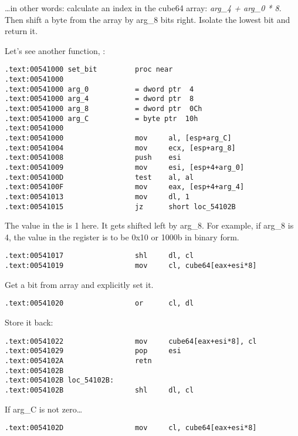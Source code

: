 \dots in other words: calculate an index in 
the cube64 array: \emph{arg\_4 + arg\_0 * 8}.
Then shift a byte from the array by arg\_8 bits right. 
Isolate the lowest bit and return it.

Let's see another function, :

\begin{lstlisting}[style=customasmx86]
.text:00541000 set_bit         proc near
.text:00541000
.text:00541000 arg_0           = dword ptr  4
.text:00541000 arg_4           = dword ptr  8
.text:00541000 arg_8           = dword ptr  0Ch
.text:00541000 arg_C           = byte ptr  10h
.text:00541000
.text:00541000                 mov     al, [esp+arg_C]
.text:00541004                 mov     ecx, [esp+arg_8]
.text:00541008                 push    esi
.text:00541009                 mov     esi, [esp+4+arg_0]
.text:0054100D                 test    al, al
.text:0054100F                 mov     eax, [esp+4+arg_4]
.text:00541013                 mov     dl, 1
.text:00541015                 jz      short loc_54102B
\end{lstlisting}

The value in the  is 1 here. It gets shifted left by arg\_8.
For example, if arg\_8 is 4, the value in the  register is to be 
0x10 or 1000b in binary form.

\begin{lstlisting}[style=customasmx86]
.text:00541017                 shl     dl, cl
.text:00541019                 mov     cl, cube64[eax+esi*8]
\end{lstlisting}

Get a bit from array and explicitly set it. %

\begin{lstlisting}[style=customasmx86]
.text:00541020                 or      cl, dl
\end{lstlisting}

Store it back: %

\begin{lstlisting}[style=customasmx86]
.text:00541022                 mov     cube64[eax+esi*8], cl
.text:00541029                 pop     esi
.text:0054102A                 retn
.text:0054102B
.text:0054102B loc_54102B:
.text:0054102B                 shl     dl, cl
\end{lstlisting}

If arg\_C is not zero\dots

\begin{lstlisting}[style=customasmx86]
.text:0054102D                 mov     cl, cube64[eax+esi*8]
\end{lstlisting}

